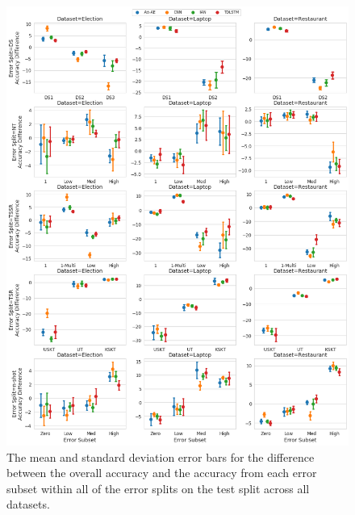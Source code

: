 \begin{figure}[ht!]
    \centering
    \includegraphics[scale=0.3]{images/augmentation/methods_performance/baseline/test_error_diff_subsets.png}
    \caption{The mean and standard deviation error bars for the difference between the overall accuracy and the accuracy from each error subset within all of the error splits on the test split across all datasets.}
    \label{fig:aug_baseline_test_error_diff_subset}
\end{figure}

